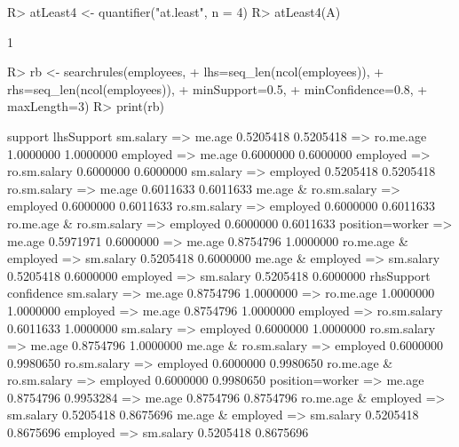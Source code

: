 \documentclass{article}\usepackage[]{graphicx}\usepackage[]{color}
\begin{document}
\begin{Schunk}
% --begin: "quant7"
\begin{Sinput}
R> atLeast4 <- quantifier("at.least", n = 4)
R> atLeast4(A)
\end{Sinput}
\begin{Soutput}
[1] 1
\end{Soutput}
%
% --end: "quant7"
\end{Schunk}

\begin{Schunk}
% --begin: "searchrules"
\begin{Sinput}
R> rb <- searchrules(employees,
+                    lhs=seq_len(ncol(employees)),
+                    rhs=seq_len(ncol(employees)),
+                    minSupport=0.5,
+                    minConfidence=0.8,
+                    maxLength=3)
R> print(rb)
\end{Sinput}
\begin{Soutput}
                                       support lhsSupport
sm.salary => me.age                  0.5205418  0.5205418
 => ro.me.age                        1.0000000  1.0000000
employed => me.age                   0.6000000  0.6000000
employed => ro.sm.salary             0.6000000  0.6000000
sm.salary => employed                0.5205418  0.5205418
ro.sm.salary => me.age               0.6011633  0.6011633
me.age & ro.sm.salary => employed    0.6000000  0.6011633
ro.sm.salary => employed             0.6000000  0.6011633
ro.me.age & ro.sm.salary => employed 0.6000000  0.6011633
position=worker => me.age            0.5971971  0.6000000
 => me.age                           0.8754796  1.0000000
ro.me.age & employed => sm.salary    0.5205418  0.6000000
me.age & employed => sm.salary       0.5205418  0.6000000
employed => sm.salary                0.5205418  0.6000000
                                     rhsSupport confidence
sm.salary => me.age                   0.8754796  1.0000000
 => ro.me.age                         1.0000000  1.0000000
employed => me.age                    0.8754796  1.0000000
employed => ro.sm.salary              0.6011633  1.0000000
sm.salary => employed                 0.6000000  1.0000000
ro.sm.salary => me.age                0.8754796  1.0000000
me.age & ro.sm.salary => employed     0.6000000  0.9980650
ro.sm.salary => employed              0.6000000  0.9980650
ro.me.age & ro.sm.salary => employed  0.6000000  0.9980650
position=worker => me.age             0.8754796  0.9953284
 => me.age                            0.8754796  0.8754796
ro.me.age & employed => sm.salary     0.5205418  0.8675696
me.age & employed => sm.salary        0.5205418  0.8675696
employed => sm.salary                 0.5205418  0.8675696
\end{Soutput}
%
% --end: "searchrules"
\end{Schunk}
\end{document}
